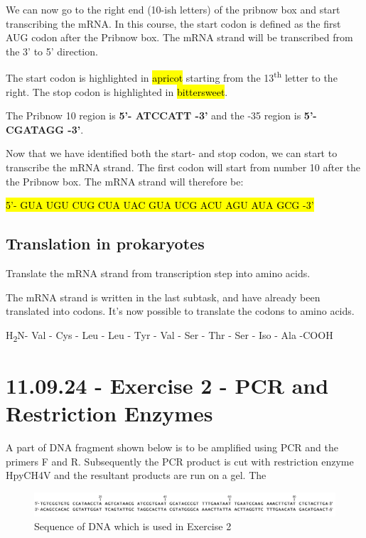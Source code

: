 We can now go to the right end (10-ish letters) of the pribnow box and start transcribing the mRNA. In this course, the start codon is defined as the first AUG codon after the Pribnow box. The mRNA strand will be transcribed from the 3' to 5' direction.

The start codon is highlighted in \hl{apricot} starting from the 13\textsuperscript{th} letter to the right. The stop codon is highlighted in \hl{bittersweet}.


The Pribnow 10 region is \textbf{5’- ATCCATT -3’} and the -35 region is \textbf{5’- CGATAGG -3’}.

Now that we have identified both the start- and stop codon, we can start to transcribe the mRNA strand. The first codon will start from number 10 after the the Pribnow box. The mRNA strand will therefore be: 

\hl{5'- GUA UGU CUG CUA UAC GUA UCG ACU AGU AUA GCG -3'}

\subsection{Translation in prokaryotes}
Translate the mRNA strand from transcription step into amino acids.

\vspace{1em}
The mRNA strand is written in the last subtask, and have already been translated into codons. It's now possible to translate the codons to amino acids.

H\textsubscript{2}N- Val - Cys - Leu - Leu - Tyr - Val - Ser - Thr - Ser - Iso - Ala -COOH

\section{11.09.24 - Exercise 2 - PCR and Restriction Enzymes}
A part of DNA fragment shown below is to be amplified using PCR and the primers F and R.  Subsequently the PCR product is cut with restriction enzyme HpyCH4V and the resultant products are run on a gel. The

\begin{figure}[h]
    \centering
    \includegraphics[width=1\textwidth]{Figures/Exc2DNA.png}
    \caption{Sequence of DNA which is used in Exercise 2}
    \label{fig:Exercise2Seq}
\end{figure}

